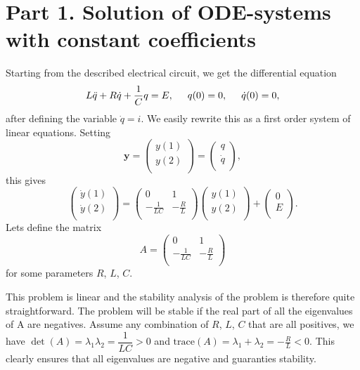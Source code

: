 \section*{Part 1. Solution of ODE-systems with constant coefficients}

Starting from the described electrical circuit, we get the differential equation
$$L\ddot{q}+R\dot{q}+\frac{1}{C}q = E,\hspace*{5mm}q(0)=0,\hspace*{5mm}\dot{q}(0)=0,$$
after defining the variable $\dot{q}=i$. We easily rewrite this as a first order system of linear equations. Setting $$\textbf{y}= \begin{pmatrix}
y(1)\\
y(2)\\
\end{pmatrix} = \begin{pmatrix}
q\\
\dot{q}\\
\end{pmatrix},$$
this gives
$$\begin{pmatrix}
\dot{y}(1)\\
\dot{y}(2)\\
\end{pmatrix}= \begin{pmatrix}
0 & 1\\
- \frac{1}{LC} & -\frac{R}{L}\\
\end{pmatrix}\begin{pmatrix}
y(1)\\
y(2)\\
\end{pmatrix}
+ \begin{pmatrix}
0\\
E\\
\end{pmatrix}.$$
Lets define the matrix 
$$A=\begin{pmatrix}
0 & 1\\
- \frac{1}{LC} & -\frac{R}{L}\\
\end{pmatrix}$$ for some parameters $R$, $L$, $C$.

This problem is linear and the stability analysis of the problem is therefore quite straightforward. The problem will be stable if the real part of all the eigenvalues of A are negatives. Assume any combination of $R$, $L$, $C$ that are all positives, we have $\det(A)= \lambda_1 \lambda_2 = \dfrac{1}{LC}>0$ and $\text{trace}(A)= \lambda_1 + \lambda_2 = -\frac{R}{L}<0$. This clearly ensures that all eigenvalues are negative and guaranties stability.

